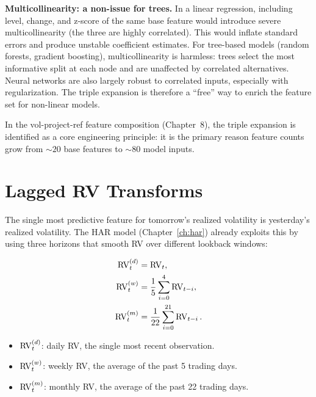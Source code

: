 \textbf{Multicollinearity: a non-issue for trees.}
In a linear regression, including level, change, and z-score of the same base feature would introduce severe multicollinearity (the three are highly correlated).
This would inflate standard errors and produce unstable coefficient estimates.
For tree-based models (random forests, gradient boosting), multicollinearity is harmless: trees select the most informative split at each node and are unaffected by correlated alternatives.
Neural networks are also largely robust to correlated inputs, especially with regularization.
The triple expansion is therefore a ``free'' way to enrich the feature set for non-linear models.

\begin{projectconnection}
In the vol-project-ref feature composition (Chapter~8), the triple expansion is identified as a core engineering principle: it is the primary reason feature counts grow from ${\sim}20$ base features to ${\sim}80$ model inputs.
\end{projectconnection}

\section{Lagged RV Transforms}\label{sec:feat-lagged-rv}

The single most predictive feature for tomorrow's realized volatility is yesterday's realized volatility.
The HAR model (Chapter~\ref{ch:har}) already exploits this by using three horizons that smooth RV over different lookback windows:

\begin{align}
\operatorname{RV}_t^{(d)} &= \operatorname{RV}_t, \label{eq:rv-d}\\
\operatorname{RV}_t^{(w)} &= \frac{1}{5}\sum_{i=0}^{4} \operatorname{RV}_{t-i}, \label{eq:rv-w}\\
\operatorname{RV}_t^{(m)} &= \frac{1}{22}\sum_{i=0}^{21} \operatorname{RV}_{t-i}. \label{eq:rv-m}
\end{align}
\begin{itemize}[nosep]
  \item $\operatorname{RV}_t^{(d)}$: daily RV, the single most recent observation.
  \item $\operatorname{RV}_t^{(w)}$: weekly RV, the average of the past 5 trading days.
  \item $\operatorname{RV}_t^{(m)}$: monthly RV, the average of the past 22 trading days.
\end{itemize}


